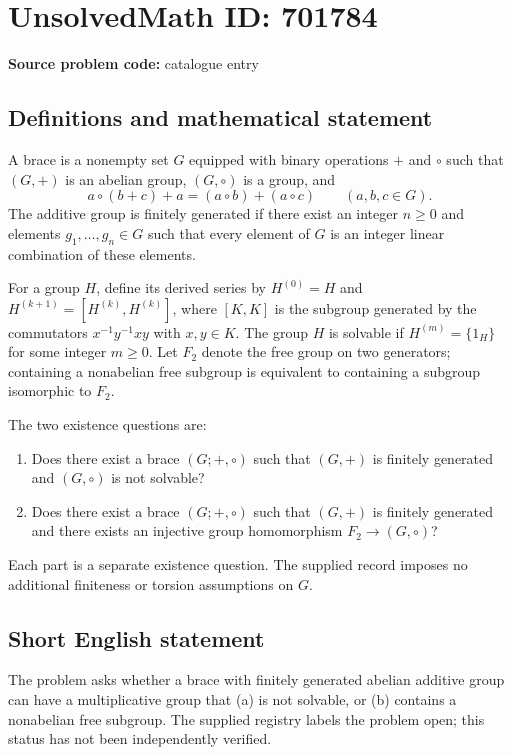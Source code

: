 \documentclass[11pt]{article}
\begin{document}
\section*{UnsolvedMath ID: 701784}
\textbf{Source problem code:} catalogue entry
\subsection{Definitions and mathematical statement}
A brace is a nonempty set \(G\) equipped with binary operations \(+\) and \(\circ\) such that \((G,+)\) is an abelian group, \((G,\circ)\) is a group, and
\[
a\circ(b+c)+a=(a\circ b)+(a\circ c)\qquad(a,b,c\in G).
\]
The additive group is finitely generated if there exist an integer \(n\geq 0\) and elements \(g_1,\ldots,g_n\in G\) such that every element of \(G\) is an integer linear combination of these elements.

For a group \(H\), define its derived series by \(H^{(0)}=H\) and \(H^{(k+1)}=[H^{(k)},H^{(k)}]\), where \([K,K]\) is the subgroup generated by the commutators \(x^{-1}y^{-1}xy\) with \(x,y\in K\). The group \(H\) is solvable if \(H^{(m)}=\{1_H\}\) for some integer \(m\geq 0\). Let \(F_2\) denote the free group on two generators; containing a nonabelian free subgroup is equivalent to containing a subgroup isomorphic to \(F_2\).

The two existence questions are:
\begin{enumerate}
\item[(a)] Does there exist a brace \((G;+,\circ)\) such that \((G,+)\) is finitely generated and \((G,\circ)\) is not solvable?
\item[(b)] Does there exist a brace \((G;+,\circ)\) such that \((G,+)\) is finitely generated and there exists an injective group homomorphism \(F_2\longrightarrow(G,\circ)\)?
\end{enumerate}
Each part is a separate existence question. The supplied record imposes no additional finiteness or torsion assumptions on \(G\).
\subsection{Short English statement}
The problem asks whether a brace with finitely generated abelian additive group can have a multiplicative group that (a) is not solvable, or (b) contains a nonabelian free subgroup. The supplied registry labels the problem open; this status has not been independently verified.
\end{document}
